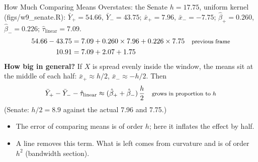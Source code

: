 \documentclass[aspectratio=169,11pt,xcolor=dvipsnames]{beamer}
\newcommand{\srcp}[1]{{\scriptsize\color{gray}(#1)}}
\begin{document}
\begin{frame}{How Much Comparing Means Overstates: the Senate}
$h = 17.75$, uniform kernel \srcp{figs/w9\_senate.R}: $\bar Y_+ = 54.66$,
$\bar Y_- = 43.75$; $\bar x_+ = 7.96$, $\bar x_- = -7.75$; $\hat\beta_+ = 0.260$,
$\hat\beta_- = 0.226$; $\hat\tau_{\text{linear}} = 7.09$.
\begin{align*}
  54.66 - 43.75 &= 7.09 + 0.260 \times 7.96 + 0.226 \times 7.75
   && \text{\footnotesize previous frame} \\
  10.91 &= 7.09 + 2.07 + 1.75
\end{align*}
\textbf{How big in general?} If $X$ is spread evenly inside the window, the means
sit at the middle of each half: $\bar x_+ \approx h/2$, $\bar x_- \approx -h/2$. Then
\begin{align*}
  \bar Y_+ - \bar Y_- - \hat\tau_{\text{linear}}
  \approx (\hat\beta_+ + \hat\beta_-)\,\frac{h}{2}
   && \text{\footnotesize grows in proportion to $h$}
\end{align*}
(Senate: $h/2 = 8.9$ against the actual 7.96 and 7.75.)
\vskip3pt
\begin{itemize}\itemsep2pt
  \item \alert{The error of comparing means is of order $h$}; here it inflates the
        effect by half.
  \item A line removes this term. What is left comes from curvature and is of
        order $h^2$ (bandwidth section).
\end{itemize}
\end{frame}
\end{document}
